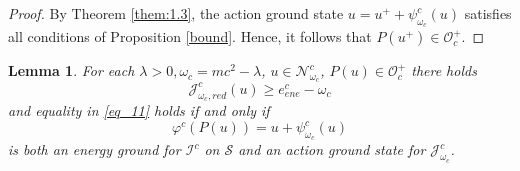 \documentclass{amsart}
\theoremstyle{plain}
\newtheorem{lemma}[theorem]{Lemma}
\theoremstyle{definition}
\theoremstyle{remark}
\numberwithin{equation}{section} \numberwithin{figure}{section}
\begin{document}
\begin{proof}
  By Theorem \ref{them:1.3}, the action ground state $u = u^+ + \psi_{\omega_c}^c(u)$ satisfies
   all conditions of Proposition \ref{bound}. Hence, it follows that \(P(u^+) \in \mathcal{O}_c^+\).
\end{proof}
\begin{lemma}\label{ine}
  For each $\lambda>0, \omega_c= mc^2-\lambda$, $u\in  \mathcal{N}_{\omega_c}^c$, $P(u)\in \mathcal{O}_c^+$ there  holds
  \begin{equation}\label{eq_11}
       \mathcal{J}^c_{\omega_c,red}(u)\geq e_{ene}^c-\omega_c
  \end{equation}
  and equality in \eqref{eq_11} holds if and only if
  $$
 \varphi^c(P(u))=u + \psi_{\omega_c}^c(u)
  $$
  is both an energy ground for $\mathcal{I}^c$
on $\mathcal{S}$ and an action ground state
for $\mathcal{J}^c_{\omega_c}$.
\end{lemma}
\end{document}

